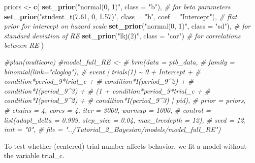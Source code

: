 \documentclass[
  man,floatsintext]{apa6}
\newenvironment{Shaded}{\begin{snugshade}}{\end{snugshade}}
\newcommand{\AttributeTok}[1]{\textcolor[rgb]{0.13,0.29,0.53}{#1}}
\newcommand{\CommentTok}[1]{\textcolor[rgb]{0.56,0.35,0.01}{\textit{#1}}}
\newcommand{\FunctionTok}[1]{\textcolor[rgb]{0.13,0.29,0.53}{\textbf{#1}}}
\newcommand{\NormalTok}[1]{#1}
\newcommand{\OtherTok}[1]{\textcolor[rgb]{0.56,0.35,0.01}{#1}}
\newcommand{\StringTok}[1]{\textcolor[rgb]{0.31,0.60,0.02}{#1}}
\begin{document}
\begin{Shaded}
\begin{Highlighting}[]
\NormalTok{priors }\OtherTok{\textless{}{-}} \FunctionTok{c}\NormalTok{(}
  \FunctionTok{set\_prior}\NormalTok{(}\StringTok{"normal(0, 1)"}\NormalTok{, }\AttributeTok{class =} \StringTok{"b"}\NormalTok{), }\CommentTok{\# for beta parameters }
  \FunctionTok{set\_prior}\NormalTok{(}\StringTok{"student\_t(7.61, 0, 1.57)"}\NormalTok{, }\AttributeTok{class =} \StringTok{"b"}\NormalTok{, }\AttributeTok{coef =} \StringTok{"Intercept"}\NormalTok{), }\CommentTok{\# flat prior for intercept on hazard scale}
  \FunctionTok{set\_prior}\NormalTok{(}\StringTok{"normal(0, 1)"}\NormalTok{, }\AttributeTok{class =} \StringTok{"sd"}\NormalTok{), }\CommentTok{\# for standard deviation of RE}
  \FunctionTok{set\_prior}\NormalTok{(}\StringTok{"lkj(2)"}\NormalTok{, }\AttributeTok{class =} \StringTok{"cor"}\NormalTok{) }\CommentTok{\# for correlations between RE}
\NormalTok{)}
\end{Highlighting}
\end{Shaded}

\begin{Shaded}
\begin{Highlighting}[]
\CommentTok{\#plan(multicore)}
\CommentTok{\#model\_full\_RE \textless{}{-}}
\CommentTok{\#   brm(data = ptb\_data,}
\CommentTok{\#       family = binomial(link="cloglog"),}
\CommentTok{\#       event | trials(1) \textasciitilde{} 0 + Intercept + }
\CommentTok{\#                           condition*period\_9*trial\_c + }
\CommentTok{\#                           condition*I(period\_9\^{}2) + }
\CommentTok{\#                           condition*I(period\_9\^{}3) +}
\CommentTok{\#                           (1 + condition*period\_9*trial\_c +}
\CommentTok{\#                           condition*I(period\_9\^{}2) +}
\CommentTok{\#                           condition*I(period\_9\^{}3) | pid),}
\CommentTok{\#       prior = priors,}
\CommentTok{\#       chains = 4, cores = 4, iter = 3000, warmup = 1000,}
\CommentTok{\#       control = list(adapt\_delta = 0.999, step\_size = 0.04, max\_treedepth = 12),}
\CommentTok{\#       seed = 12, init = "0",}
\CommentTok{\#       file = "../Tutorial\_2\_Bayesian/models/model\_full\_RE")}
\end{Highlighting}
\end{Shaded}

\normalsize

To test whether (centered) trial number affects behavior, we fit a model without the variable trial\_c.
\end{document}
